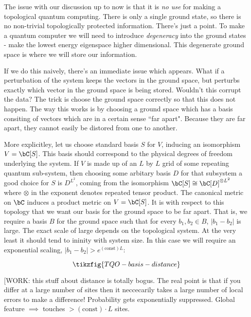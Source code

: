 The issue with our discussion up to now is that it is \textit{no use} for making a topological quantum computing. There is only a single ground state, so there is no non-trivial topologically protected information. There's just a point. To make a quantum computer we will need to introduce \textit{degeneracy} into the ground states - make the lowest energy eigenspace higher dimensional. This degenerate ground space is where we will store our information.

If we do this naively, there's an immediate issue which appears. What if a perturbation of the system keeps the vectors in the ground space, but perturbs exactly which vector in the ground space is being stored. Wouldn't this corrupt the data? The trick is choose the ground space correctly so that this does not happen. The way this works is by choosing a ground space which has a basis consiting of vectors which are in a certain sense ``far apart". Because they are far apart, they cannot easily be distored from one to another.

More explicitley, let us choose standard basis $S$ for $V$, inducing an isomorphism $V= \bC[S]$. This basis should correspond to the physical degrees of freedom underlying the system. If $V$ is made up of an $L$ by $L$ grid of some repeating quantum sub-system, then choosing some arbitary basis $D$ for that subsystem a good choice for $S$ is $D^{L^2}$, coming from the isomorphism $\bC[S]\cong \bC[D]^{\otimes L^2}$ where $\otimes$ in the exponent denotes repeated tensor product. The canonical metric on $\bC$ induces a product metric on $V=\bC[S]$. It is with respect to this topology that we want our basis for the ground space to be far apart. That is, we require a basis $B$ for the ground space such that for every $b_1,b_2\in B$, $|b_1-b_2|$ is large. The exact scale of large depends on the topological system. At the very least it should tend to ininity with system size. In this case we will require an exponential scaling, $|b_1-b_2|>e^{(\text{const})L}$:

\begin{equation*}
\tikzfig{TQO-basis-distance}
\end{equation*}

[WORK: this stuff about distance is totally bogus. The real point is that if you differ at a large number of sites then it neccecarily takes a large number of local errors to make a difference! Probability gets exponentially suppressed. Global feature $\implies$ touches $>(\text{const})\cdot L$ sites.

